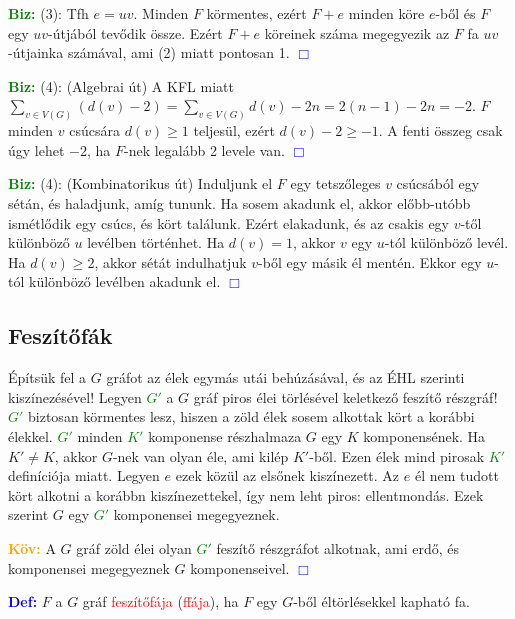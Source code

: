 \documentclass[../szamtud.tex]{subfiles}
\begin{document}
        \textcolor{green}{\textbf{Biz:}} (3): Tfh $e=uv$. Minden $F$ körmentes, ezért $F+e$ minden köre $e$-ből és $F$ egy $uv$-útjából tevődik össze. Ezért $F+e$ köreinek száma megegyezik az $F$ fa $uv$-útjainka számával, ami (2) miatt pontosan 1. \textcolor{blue}{$\Box$} 
    
        \textcolor{green}{\textbf{Biz:}} (4): (Algebrai út) A KFL miatt $\sum_{v\in V(G)}(d(v)-2)=\sum_{v\in V(G)}d(v)-2n=2(n-1)-2n=-2$. $F$ minden $v$ csúcsára $d(v) \geq 1$ teljesül, ezért $d(v) - 2 \geq -1$. A fenti összeg csak úgy lehet $-2$, ha $F$-nek legalább 2 levele van. \textcolor{blue}{$\Box$} 
    
        \textcolor{green}{\textbf{Biz:}} (4): (Kombinatorikus út) Induljunk el $F$ egy tetszőleges $v$ csúcsából egy sétán, és haladjunk, amíg tununk. Ha sosem akadunk el, akkor előbb-utóbb ismétlődik egy csúcs, és kört találunk. Ezért elakadunk, és az csakis egy $v$-től különböző $u$ levélben történhet. Ha $d(v)=1$, akkor $v$ egy $u$-tól különböző levél. Ha $d(v) \geq 2$, akkor sétát indulhatjuk $v$-ből egy másik él mentén. Ekkor egy $u$-tól különböző levélben akadunk el. \textcolor{blue}{$\Box$} 

    \subsection{Feszítőfák}
    
        Építsük fel a $G$ gráfot az élek egymás utái behúzásával, és az ÉHL szerinti kiszínezésével! Legyen \textcolor{green}{$G'$} a $G$ gráf piros élei törlésével keletkező feszítő részgráf! \textcolor{green}{$G'$} biztosan körmentes lesz, hiszen a zöld élek sosem alkottak kört a korábbi élekkel. \textcolor{green}{$G'$} minden \textcolor{green}{$K'$} komponense részhalmaza $G$ egy $K$ komponensének. Ha $K' \neq K$, akkor $G$-nek van olyan éle, ami kilép $K'$-ből. Ezen élek mind pirosak \textcolor{green}{$K'$} definíciója miatt. Legyen $e$ ezek közül az elsőnek kiszínezett. Az $e$ él nem tudott kört alkotni a korábbn kiszínezettekel, így nem leht piros: ellentmondás. Ezek szerint $G$ egy \textcolor{green}{$G'$} komponensei megegyeznek.

        \textcolor{orange}{\textbf{Köv:}} A $G$ gráf zöld élei olyan \textcolor{green}{$G'$} feszítő részgráfot alkotnak, ami erdő, és komponensei megegyeznek $G$ komponenseivel. \textcolor{blue}{$\Box$} 

        \textcolor{blue}{\textbf{Def:}} $F$ a $G$ gráf \textcolor{red}{feszítőfája} (\textcolor{red}{ffája}), ha $F$ egy $G$-ből éltörlésekkel kapható fa.
\end{document}
